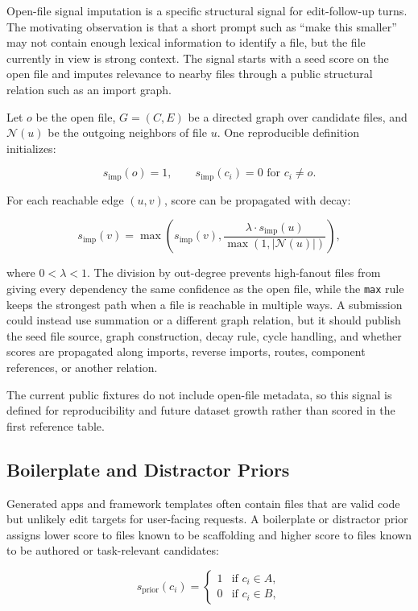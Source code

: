 \documentclass[11pt,a4paper]{article}
\begin{document}
Open-file signal imputation is a specific structural signal for edit-follow-up
turns. The motivating observation is that a short prompt such as ``make this
smaller'' may not contain enough lexical information to identify a file, but the
file currently in view is strong context. The signal starts with a seed score on
the open file and imputes relevance to nearby files through a public structural
relation such as an import graph.

Let $o$ be the open file, $G=(C,E)$ be a directed graph over candidate files,
and $\mathcal{N}(u)$ be the outgoing neighbors of file $u$. One reproducible
definition initializes:

\[
s_{\mathrm{imp}}(o) = 1,\qquad
s_{\mathrm{imp}}(c_i) = 0 \text{ for } c_i \neq o.
\]

For each reachable edge $(u,v)$, score can be propagated with decay:

\[
s_{\mathrm{imp}}(v) =
\max\left(s_{\mathrm{imp}}(v),
\frac{\lambda \cdot s_{\mathrm{imp}}(u)}
{\max(1, |\mathcal{N}(u)|)}\right),
\]

where $0 < \lambda < 1$. The division by out-degree prevents high-fanout files
from giving every dependency the same confidence as the open file, while the
\texttt{max} rule keeps the strongest path when a file is reachable in multiple
ways. A submission could instead use summation or a different graph relation,
but it should publish the seed file source, graph construction, decay rule,
cycle handling, and whether scores are propagated along imports, reverse
imports, routes, component references, or another relation.

The current public fixtures do not include open-file metadata, so this signal is
defined for reproducibility and future dataset growth rather than scored in the
first reference table.

\subsection{Boilerplate and Distractor Priors}

Generated apps and framework templates often contain files that are valid code
but unlikely edit targets for user-facing requests. A boilerplate or distractor
prior assigns lower score to files known to be scaffolding and higher score to
files known to be authored or task-relevant candidates:

\[
s_{\mathrm{prior}}(c_i) =
\begin{cases}
1 & \text{if } c_i \in A,\\
0 & \text{if } c_i \in B,
\end{cases}
\]
\end{document}
